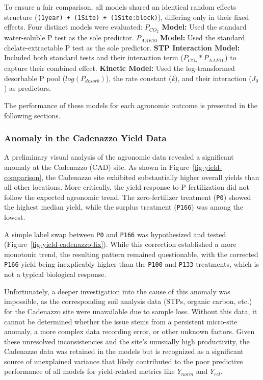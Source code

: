 \documentclass[
  a4paper,
]{article}
\begin{document}
To ensure a fair comparison, all models shared an identical random
effects structure
(\texttt{(1\textbar{}year)\ +\ (1\textbar{}Site)\ +\ (1\textbar{}Site:block)}),
differing only in their fixed effects. Four distinct models were
evaluated: \textbf{\(P_{CO_2}\) Model:} Used the standard water-soluble
P test as the sole predictor. \textbf{\(P_{AAE10}\) Model:} Used the
standard chelate-extractable P test as the sole predictor. \textbf{STP
Interaction Model:} Included both standard tests and their interaction
term (\(P_{CO_2} * P_{AAE10}\)) to capture their combined effect.
\textbf{Kinetic Model:} Used the log-transformed desorbable P pool
(\(log(P_{desorb})\)), the rate constant (\emph{k}), and their
interaction (\(J_0\)) as predictors.

The performance of these models for each agronomic outcome is presented
in the following sections.

\subsubsection{Anomaly in the Cadenazzo Yield
Data}\label{anomaly-in-the-cadenazzo-yield-data}

A preliminary visual analysis of the agronomic data revealed a
significant anomaly at the Cadenazzo (CAD) site. As shown in
Figure~\ref{fig-yield-comparison}, the Cadenazzo site exhibited
substantially higher overall yields than all other locations. More
critically, the yield response to P fertilization did not follow the
expected agronomic trend. The zero-fertilizer treatment (\texttt{P0})
showed the highest median yield, while the surplus treatment
(\texttt{P166}) was among the lowest.

A simple label swap between \texttt{P0} and \texttt{P166} was
hypothesized and tested (Figure~\ref{fig-yield-cadenazzo-fix}). While
this correction established a more monotonic trend, the resulting
pattern remained questionable, with the corrected \texttt{P166} yield
being inexplicably higher than the \texttt{P100} and \texttt{P133}
treatments, which is not a typical biological response.

Unfortunately, a deeper investigation into the cause of this anomaly was
impossible, as the corresponding soil analysis data (STPs, organic
carbon, etc.) for the Cadenazzo site were unavailable due to sample
loss. Without this data, it cannot be determined whether the issue stems
from a persistent micro-site anomaly, a more complex data recording
error, or other unknown factors. Given these unresolved inconsistencies
and the site's unusually high productivity, the Cadenazzo data was
retained in the models but is recognized as a significant source of
unexplained variance that likely contributed to the poor predictive
performance of all models for yield-related metrics like \(Y_{norm}\)
and \(Y_{rel}\).
\end{document}
